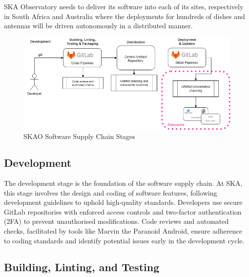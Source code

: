 \documentclass[a4paper]{spie}  %
\begin{document}
SKA Observatory needs to deliver its software into each of its sites, respectively in South Africa and Australia where the deployments for hundreds of dishes and antennas will be driven autonomously in a distributed manner.


   \begin{figure} [ht]
   \begin{center}
   \includegraphics[width=\textwidth,height=\textheight,keepaspectratio]{stages.png}
   \end{center}
   \caption 
   { \label{fig:stages}
SKAO Software Supply Chain Stages}
    \end{figure} 

\subsection{Development}

The development stage is the foundation of the software supply chain. At SKA, this stage involves the design and coding of software features, following development guidelines to uphold high-quality standards\cite{SKATelescopeDeveloper}. Developers use secure GitLab\cite{GitLab2024} repositories with enforced access controls and two-factor authentication (2FA) to prevent unauthorised modifications. Code reviews and automated checks, facilitated by tools like Marvin the Paranoid Android\cite{yilmazDrivingBehaviouralChange2023}, ensure adherence to coding standards and identify potential issues early in the development cycle.

\subsection{Building, Linting, and Testing}
\end{document}
